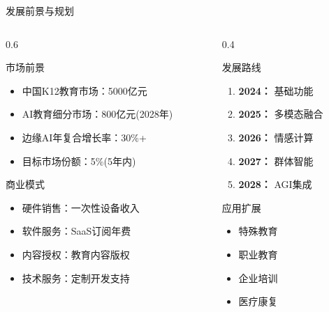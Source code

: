 \documentclass[aspectratio=169,12pt]{beamer}
\begin{document}
\begin{frame}{发展前景与规划}
    \begin{columns}
        \begin{column}{0.6\textwidth}
            \begin{block}{市场前景}
                \begin{itemize}
                    \item 中国K12教育市场：5000亿元
                    \item AI教育细分市场：800亿元(2028年)
                    \item 边缘AI年复合增长率：30\%+
                    \item 目标市场份额：5\%(5年内)
                \end{itemize}
            \end{block}
            
            \begin{block}{商业模式}
                \begin{itemize}
                    \item 硬件销售：一次性设备收入
                    \item 软件服务：SaaS订阅年费
                    \item 内容授权：教育内容版权
                    \item 技术服务：定制开发支持
                \end{itemize}
            \end{block}
        \end{column}
        \begin{column}{0.4\textwidth}
            \begin{block}{发展路线}
                \begin{enumerate}
                    \item \textbf{2024：} 基础功能
                    \item \textbf{2025：} 多模态融合
                    \item \textbf{2026：} 情感计算
                    \item \textbf{2027：} 群体智能
                    \item \textbf{2028：} AGI集成
                \end{enumerate}
            \end{block}
            
            \begin{block}{应用扩展}
                \begin{itemize}
                    \item 特殊教育
                    \item 职业教育
                    \item 企业培训
                    \item 医疗康复
                \end{itemize}
            \end{block}
        \end{column}
    \end{columns}
\end{frame}
\end{document}

